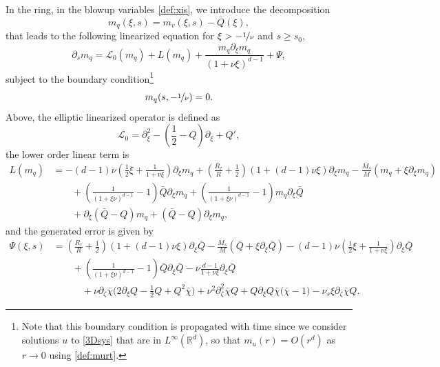 \documentclass[11pt]{aims}
\theoremstyle{definition}
\newcommand{\Ls}{\mathscr{L}}
\newcommand{\pa}{\partial}
\numberwithin{equation}{section}
\begin{document}
In the ring, in the blowup variables \eqref{def:xis}, we introduce the decomposition
\begin{equation} \label{def:mq}
m_q(\xi,s) = m_v(\xi,s) - \bar Q(\xi),
\end{equation}
that leads to the following linearized equation for $\xi > -\nicefrac{1}{\nu}$ and $s\geq s_0$, 
\begin{equation}\label{eq:mqxis}
\pa_s m_q=\Ls_0 (m_q) + L(m_q) + \frac{m_q \partial_\xi m_q}{(1 +\nu \xi )^{d-1}} + \Psi,
\end{equation}
subject to the boundary condition\footnote{Note that this boundary condition is propagated with time since we consider solutions $u$ to \eqref{3Dsys} that are in $L^\infty(\mathbb R^d)$, so that $m_u(r)=O(r^d)$ as $r\to 0$ using \eqref{def:murt}.} 
$$m_q(s,-\nicefrac{1}{\nu})=0.$$
Above, the elliptic linearized operator is defined as
\begin{equation}\label{def:Lop}
\Ls_0 = \partial_\xi^2 - \left(\frac{1}{2} - Q\right)\partial_\xi + Q',
\end{equation}
the lower order linear term is
\begin{align}
\nonumber L(m_q)&= -(d-1)\nu \left(\frac 12 \xi +\frac{1}{1+\nu \xi} \right) \pa_\xi m_q + \left(\frac{R_\tau}{R}+\frac{1}{2} \right)\left(1+(d-1)\nu \xi \right)\pa_\xi m_q-\frac{M_s}{M}\left(m_q+\xi\pa_\xi m_q\right)\\
\nonumber &\qquad +\left(\frac{1}{(1+\xi\nu)^{d-1}}-1 \right)\bar Q \pa_\xi m_q+\left(\frac{1}{(1+\xi\nu)^{d-1}}-1 \right)m_q\pa_\xi \bar Q\\
& \qquad + \pa_\xi (\bar Q - Q) m_q + (\bar Q - Q)\pa_\xi m_q,
\label{def:Lep}
\end{align}
and the generated error is given by
\begin{align}
\Psi(\xi,s) &=  \left(\frac{R_\tau}{R}+\frac{1}{2} \right)\left(1+(d-1)\nu \xi \right)\pa_\xi \bar Q-\frac{M_s}{M}\left(\bar Q+\xi \pa_\xi \bar Q\right)  -(d-1)\nu \left(\frac 12 \xi +\frac{1}{1+\nu \xi} \right) \pa_\xi \bar Q \nonumber\\
&\qquad +\left(\frac{1}{(1+\xi\nu)^{d-1}}-1 \right)\bar Q \pa_\xi \bar Q -\nu \frac{d-1}{1+\nu\xi}\pa_\xi \bar Q \nonumber\\
& \qquad \quad + \nu \pa_\zeta \bar \chi \Big( 2\pa_\xi Q - \frac{1}{2}Q + Q^2 \bar \chi\Big) + \nu^2\pa_{\zeta}^2 \bar \chi Q + Q \pa_\xi Q \bar \chi \big(\bar \chi - 1\big)-\nu_s \xi \pa_\zeta \bar \chi Q. \label{def:Psi}
\end{align}
\end{document}
